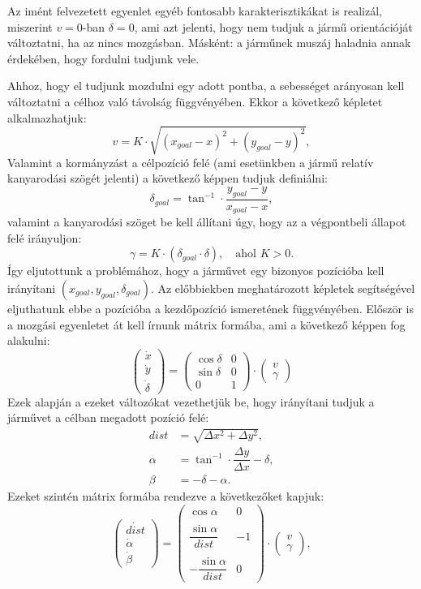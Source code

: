 Az imént felvezetett egyenlet egyéb fontosabb karakterisztikákat is realizál, miszerint $v = 0$-ban $\delta = 0$, ami azt jelenti, hogy nem tudjuk a jármű orientációját változtatni, ha az nincs mozgásban. Másként: a járműnek muszáj haladnia annak érdekében, hogy fordulni tudjunk vele. 

Ahhoz, hogy el tudjunk mozdulni egy adott pontba, a sebességet arányosan kell változtatni a célhoz való távolság függvényében. Ekkor a következő képletet alkalmazhatjuk:
\[
v = K \cdot \sqrt{(x_{goal} - x)^2 + (y_{goal} - y) ^2},
\]
Valamint a kormányzást a célpozíció felé (ami esetünkben a jármű relatív kanyarodási szögét jelenti) a következő képpen tudjuk definiálni:
\[
\delta_{goal} = \tan^{-1} \cdot \dfrac{y_{goal} - y}{x_{goal} - x},
\]
valamint a kanyarodási szöget be kell állítani úgy, hogy az a végpontbeli állapot felé irányuljon:
\[
\gamma = K \cdot (\delta_{goal} \cdot \delta),
\quad \text{ahol }K > 0.
\]
Így eljutottunk a problémához, hogy a járművet egy bizonyos pozícióba kell irányítani $(x_{goal}, y_{goal}, \delta_{goal})$. Az előbbiekben meghatározott képletek segítségével eljuthatunk ebbe a pozícióba a kezdőpozíció ismeretének függvényében. Először is a mozgási egyenletet át kell írnunk mátrix formába, ami a következő képpen fog alakulni:
\[
\begin{pmatrix}
\dot{x}\\
\dot{y}\\
\dot{\delta}
\end{pmatrix} =
\begin{pmatrix}
\cos\delta & 0\\
\sin\delta & 0\\
0 & 1
\end{pmatrix}
\cdot
\begin{pmatrix}
v\\
\gamma
\end{pmatrix}
\]
Ezek alapján a ezeket változókat vezethetjük be, hogy irányítani tudjuk a járművet a célban megadott pozíció felé:
\begin{align*}
dist &= \sqrt{\Delta x^2 + \Delta y^2}, \\
\alpha &= \tan^{-1} \cdot \dfrac{\Delta y}{\Delta x} - \delta, \\
\beta &= -\delta - \alpha.
\end{align*}
Ezeket szintén mátrix formába rendezve a következőket kapjuk:\\
\[
\begin{pmatrix}
\dot{dist}\\
\dot{\alpha}\\
\dot{\beta}
\end{pmatrix}
=
\begin{pmatrix}
\cos\alpha & 0\\\\
\dfrac{\sin\alpha}{dist} & -1\\\\
-\dfrac{\sin\alpha}{dist} & 0
\end{pmatrix}
\cdot
\begin{pmatrix}
v\\
\gamma
\end{pmatrix},
\]

